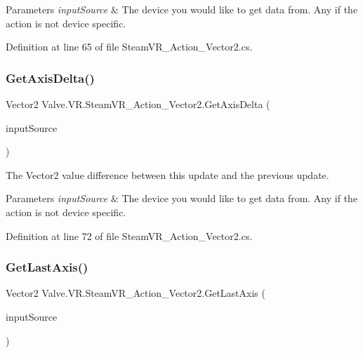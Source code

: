 \begin{DoxyParams}{Parameters}
{\em input\+Source} & The device you would like to get data from. Any if the action is not device specific.\\
\hline
\end{DoxyParams}


Definition at line 65 of file Steam\+V\+R\+\_\+\+Action\+\_\+\+Vector2.\+cs.

\mbox{\label{class_valve_1_1_v_r_1_1_steam_v_r___action___vector2_a87c7b602c486249f0bb0a8f908fb82c0}} 
\subsubsection{\texorpdfstring{GetAxisDelta()}{GetAxisDelta()}}
{\footnotesize\ttfamily Vector2 Valve.\+V\+R.\+Steam\+V\+R\+\_\+\+Action\+\_\+\+Vector2.\+Get\+Axis\+Delta (\begin{DoxyParamCaption}\item[{\mbox{\hyperlink{namespace_valve_1_1_v_r_a82e5bf501cc3aa155444ee3f0662853f}{Steam\+V\+R\+\_\+\+Input\+\_\+\+Sources}}}]{input\+Source }\end{DoxyParamCaption})}



The Vector2 value difference between this update and the previous update. 


\begin{DoxyParams}{Parameters}
{\em input\+Source} & The device you would like to get data from. Any if the action is not device specific.\\
\hline
\end{DoxyParams}


Definition at line 72 of file Steam\+V\+R\+\_\+\+Action\+\_\+\+Vector2.\+cs.

\mbox{\label{class_valve_1_1_v_r_1_1_steam_v_r___action___vector2_aaef8a836bd1040eb6854ba7ad5a5d042}} 
\subsubsection{\texorpdfstring{GetLastAxis()}{GetLastAxis()}}
{\footnotesize\ttfamily Vector2 Valve.\+V\+R.\+Steam\+V\+R\+\_\+\+Action\+\_\+\+Vector2.\+Get\+Last\+Axis (\begin{DoxyParamCaption}\item[{\mbox{\hyperlink{namespace_valve_1_1_v_r_a82e5bf501cc3aa155444ee3f0662853f}{Steam\+V\+R\+\_\+\+Input\+\_\+\+Sources}}}]{input\+Source }\end{DoxyParamCaption})}



